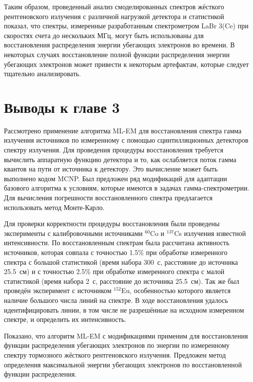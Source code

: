 Таким образом, проведенный анализ смоделированных спектров жёсткого рентгеновского излучения с различной нагрузкой детектора и статистикой показал, что спектры, измеренные разработанным спектрометром LaBr 3(Ce) при скоростях счета до нескольких МГц, могут быть использованы для восстановления распределения энергии убегающих электронов во времени. В некоторых случаях восстановление полной функции распределения энергии убегающих электронов может привести к некоторым артефактам, которые следует тщательно анализировать. 


\section{Выводы к главе 3}

Рассмотрено применение алгоритма ML-EM для восстановления спектра гамма излучения источников по измеренному с помощью сцинтилляционных детекторов спектру излучения. Для проведения процедуры восстановления требуется вычислить аппаратную функцию детектора и то, как ослабляется поток гамма квантов на пути от источника к детектору. Это вычисление может быть выполнено кодом MCNP. Был предложен ряд модификаций для адаптации базового алгоритма к условиям, которые имеются в задачах гамма-спектрометрии. Для вычисления погрешности восстановленного спектра предлагается использовать метод Монте-Карло.

Для проверки корректности процедуры восстановления были проведены эксперименты с калибровочными источниками ${}^{60}$Co и ${}^{137}$Cs излучения известной интенсивности. По восстановленным спектрам была рассчитана активность источников, которая совпала с точностью 1.5\% при обработке измеренного спектра с большой статистикой (время набора 300~с, расстояние до источника 25.5~см) и с точностью 2.5\% при обработке измеренного спектра с малой статистикой (время набора 2~с, расстояние до источника 25.5~см). Так же был проведён эксперимент с источником ${}^{152}$Eu, особенностью которого является наличие большого числа линий на спектре. В ходе восстановления удалось идентифицировать линии, в том числе не разрешённые на исходном измеренном спектре, и определить их интенсивность.  

Показано, что алгоритм ML-EM с модификациями применим для восстановления функции распределения убегающих электронов по энергии по измеренному спектру тормозного жёсткого рентгеновского излучения. Предложен метод определения максимальной энергии убегающих электронов по восстановленной функции распределения. 

